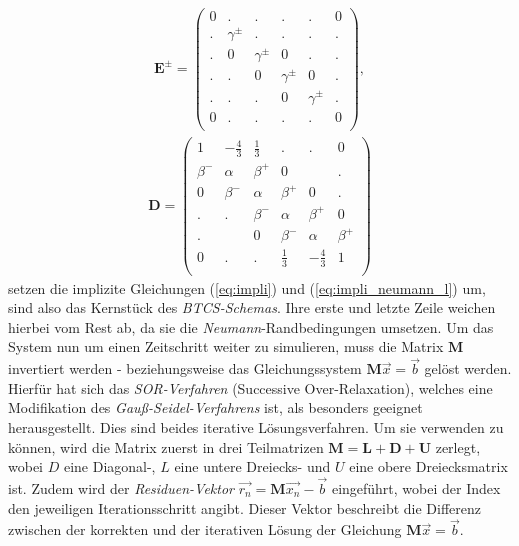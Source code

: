 \documentclass[12pt,a4paper,titlepage,headinclude,bibtotoc]{scrartcl}
\begin{document}
\begin{align*}
\boldsymbol{E^\pm} = \begin{pmatrix}
	0 & . & .& .& .& 0\\
	. & \gamma^\pm & . & . & . & .\\
	. & 0 & \gamma^\pm & 0 & . & .\\
	. & . & 0 & \gamma^\pm & 0  & .\\  
	. & . & . & 0 &  \gamma^\pm & .\\ 
	0 & . & .& .& .& 0\\
 \end{pmatrix},
\end{align*}
\begin{align*}
 \boldsymbol{D} = \begin{pmatrix}
	1 & -\frac{4}{3} & \frac{1}{3} & .& .& 0\\
	\beta^- & \alpha & \beta^+ & 0 &  & .\\ 
	0 & \beta^- & \alpha & \beta^+ & 0 & .\\ 
	. & . & \beta^- & \alpha & \beta^+ & 0\\ 
	. &   & 0 & \beta^- & \alpha & \beta^+\\ 
	0 & . & .& \frac{1}{3} & -\frac{4}{3} & 1\\
 \end{pmatrix}
 \end{align*}
 setzen die implizite Gleichungen (\ref{eq:impli}) und (\ref{eq:impli_neumann_l}) um, sind also das Kernstück des \textit{BTCS-Schemas}. Ihre erste und letzte Zeile weichen hierbei vom Rest ab, da sie die \textit{Neumann}-Randbedingungen umsetzen.
Um das System nun um einen Zeitschritt weiter zu simulieren, muss die Matrix $\textbf{M}$ invertiert werden - beziehungsweise das Gleichungssystem $\textbf{M} \vec{x} = \vec{b}$ gelöst werden.\\
Hierfür hat sich das \textit{SOR-Verfahren} (Successive Over-Relaxation), welches eine Modifikation des \textit{Gauß-Seidel-Verfahrens} ist, als besonders geeignet herausgestellt. Dies sind beides iterative Lösungsverfahren. Um sie verwenden zu können, wird die Matrix zuerst in drei Teilmatrizen $\boldsymbol{M}=\boldsymbol{L}+\boldsymbol{D}+\boldsymbol{U}$ zerlegt, wobei $D$ eine Diagonal-, $L$ eine untere Dreiecks- und $U$ eine obere Dreiecksmatrix ist. Zudem wird der \textit{Residuen-Vektor} $\vec{r_n} = \boldsymbol{M} \vec{x_n} - \vec{b}$ eingeführt, wobei der Index den jeweiligen Iterationsschritt angibt. Dieser Vektor beschreibt die Differenz zwischen der korrekten und der iterativen Lösung der Gleichung $\boldsymbol{M} \vec{x} = \vec{b}$.\\
\end{document}
